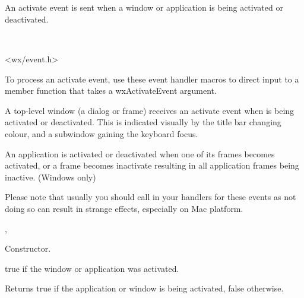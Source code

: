 \section{}\label{wxactivateevent}

An activate event is sent when a window or application is being activated
or deactivated.


\\


<wx/event.h>


To process an activate event, use these event handler macros to direct input to a member
function that takes a wxActivateEvent argument.

\twocolwidtha{7cm}
\begin{twocollist}\itemsep=0pt
\end{twocollist}%


A top-level window (a dialog or frame) receives an activate event when is
being activated or deactivated. This is indicated visually by the title
bar changing colour, and a subwindow gaining the keyboard focus.

An application is activated or deactivated when one of its frames becomes activated,
or a frame becomes inactivate resulting in all application frames being inactive. (Windows only)

Please note that usually you should call  in
your handlers for these events as not doing so can result in strange effects,
especially on Mac platform.


,\rtfsp
{}


\label{wxactivateeventctor}


Constructor.

\label{wxactivateeventmactive}


true if the window or application was activated.

\label{wxactivateeventgetactive}


Returns true if the application or window is being activated, false otherwise.

